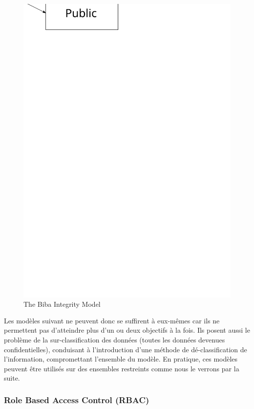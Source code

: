 \documentclass[pdftex,a4paper,titlepage,11pt]{article}
\begin{document}
\begin{figure}[h]
	\centering
	\includegraphics[scale=0.5]{biba}
	\caption{The Biba Integrity Model}
\end{figure}

\bigskip

Les modèles suivant ne peuvent donc se suffirent à eux-mêmes car ils ne permettent pas d'atteindre plus d'un ou deux objectifs à la fois. Ils posent aussi le problème de la sur-classification des données (toutes les données devenues confidentielles), conduisant à l'introduction d'une méthode de dé-classification de l'information, compromettant l'ensemble du modèle.
En pratique, ces modèles peuvent être utilisés sur des ensembles restreints comme nous le verrons par la suite.

\subsubsection{Role Based Access Control (RBAC)}
\end{document}
